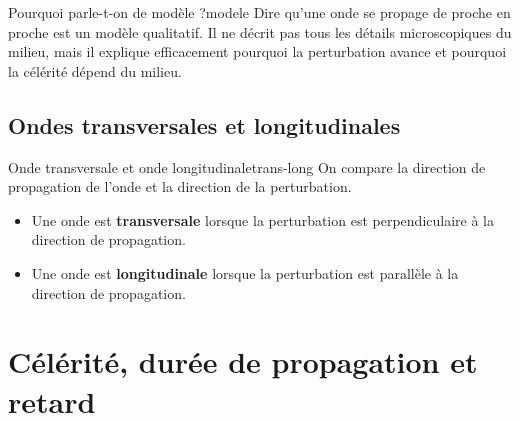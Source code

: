 \documentclass[11pt,a4paper]{article}
\begin{document}
\begin{remarquebox}{Pourquoi parle-t-on de modèle ?}{modele}
Dire qu'une onde se propage de proche en proche est un modèle qualitatif. Il ne décrit pas tous les détails microscopiques du milieu, mais il explique efficacement pourquoi la perturbation avance et pourquoi la célérité dépend du milieu.
\end{remarquebox}

\subsection{Ondes transversales et longitudinales}

\begin{definitionbox}{Onde transversale et onde longitudinale}{trans-long}
On compare la direction de propagation de l'onde et la direction de la perturbation.
\begin{itemize}
  \item Une onde est \textbf{transversale} lorsque la perturbation est perpendiculaire à la direction de propagation.
  \item Une onde est \textbf{longitudinale} lorsque la perturbation est parallèle à la direction de propagation.
\end{itemize}
\end{definitionbox}

\begin{center}
\end{center}

\section{Célérité, durée de propagation et retard}
\end{document}
